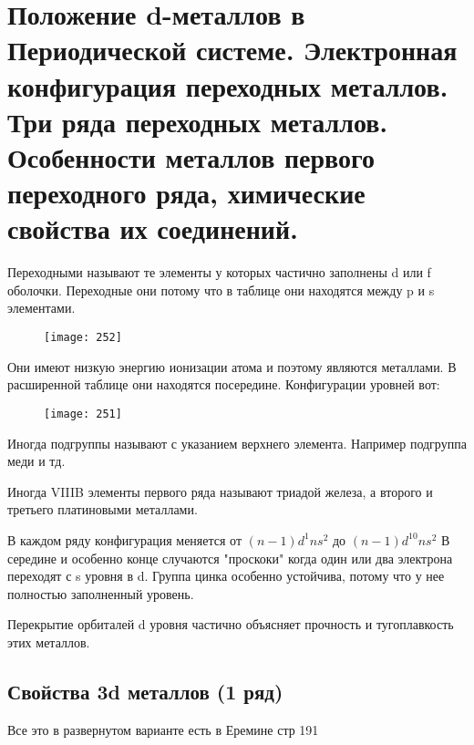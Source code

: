 
	\section{Положение d-металлов в Периодической системе. Электронная конфигурация переходных металлов. Три ряда переходных металлов. Особенности металлов первого переходного ряда, химические свойства их соединений.}
	Переходными называют те элементы у которых частично заполнены d или f оболочки.	Переходные они потому что в таблице они находятся между p и s элементами.
	\begin{figure}[H]
		\texttt{[image: 252]}
	\end{figure}
	Они имеют низкую энергию ионизации атома и поэтому являются металлами. В расширенной таблице они находятся посередине. Конфигурации уровней вот:
	\begin{figure}[H]
		\texttt{[image: 251]}
	\end{figure}
Иногда подгруппы называют с указанием верхнего элемента. Например подгруппа меди и тд.

Иногда VIIIB элементы первого ряда называют триадой железа, а второго и третьего платиновыми металлами. 

В каждом ряду конфигурация меняется от $(n- 1)d^1 n s^2 $ до $(n- 1)d^{10} n s^2 $ В середине и особенно конце случаются "проскоки" когда один или два электрона переходят с s уровня в d. Группа цинка особенно устойчива, потому что у нее полностью заполненный уровень. 

Перекрытие орбиталей d уровня частично объясняет прочность и тугоплавкость этих металлов. 
\subsection{Свойства 3d металлов (1 ряд)}
Все это в развернутом варианте есть в Еремине  стр 191


